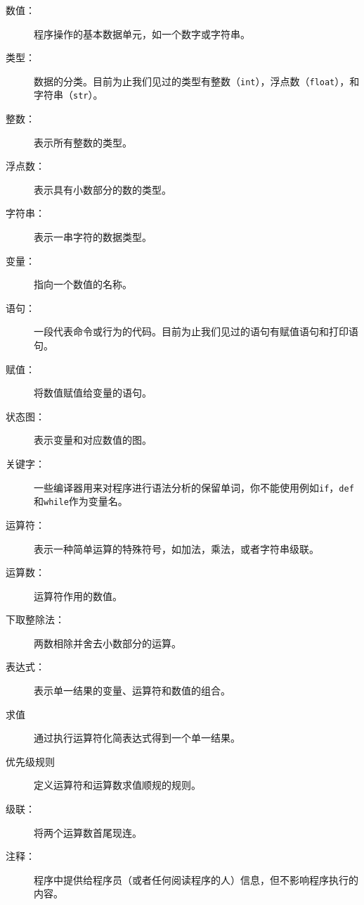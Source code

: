 \begin{description}

\item[数值：] 程序操作的基本数据单元，如一个数字或字符串。

\item[类型：] 数据的分类。目前为止我们见过的类型有整数（{\tt int}），浮点数（{\tt float}），和字符串（{\tt str}）。

\item[整数：] 表示所有整数的类型。

\item[浮点数：] 表示具有小数部分的数的类型。

\item[字符串：] 表示一串字符的数据类型。

\item[变量：] 指向一个数值的名称。

\item[语句：] 一段代表命令或行为的代码。目前为止我们见过的语句有赋值语句和打印语句。

\item[赋值：] 将数值赋值给变量的语句。

\item[状态图：] 表示变量和对应数值的图。

\item[关键字：] 一些编译器用来对程序进行语法分析的保留单词，你不能使用例如{\tt if}，{\tt  def}和{\tt while}作为变量名。

\item[运算符：] 表示一种简单运算的特殊符号，如加法，乘法，或者字符串级联。

\item[运算数：] 运算符作用的数值。

\item[下取整除法：] 两数相除并舍去小数部分的运算。

\item[表达式：] 表示单一结果的变量、运算符和数值的组合。

\item[求值] 通过执行运算符化简表达式得到一个单一结果。

\item[优先级规则] 定义运算符和运算数求值顺规的规则。

\item[级联：] 将两个运算数首尾现连。

\item[注释：] 程序中提供给程序员（或者任何阅读程序的人）信息，但不影响程序执行的内容。

\end{description}



